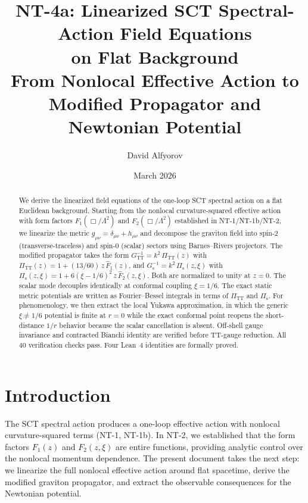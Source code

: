 \documentclass[11pt,a4paper]{article}
\title{NT-4a: Linearized SCT Spectral-Action Field Equations\\
on Flat Background\\[6pt]
\large From Nonlocal Effective Action to Modified Propagator
and Newtonian Potential}
\author{David Alfyorov}
\date{March 2026}
\theoremstyle{plain}
\theoremstyle{definition}
\begin{document}
\maketitle


\begin{center}
\end{center}

\begin{abstract}
We derive the linearized field equations of the one-loop SCT spectral
action on a flat Euclidean background. Starting from the nonlocal
curvature-squared effective action with form factors $F_1(\Box/\Lambda^2)$
and $F_2(\Box/\Lambda^2)$ established in NT-1/NT-1b/NT-2, we linearize
the metric $g_{\mu\nu} = \delta_{\mu\nu} + h_{\mu\nu}$ and decompose
the graviton field into spin-2 (transverse-traceless) and spin-0 (scalar)
sectors using Barnes--Rivers projectors. The modified propagator takes the
form $G^{-1}_{\mathrm{TT}} = k^2\, \Pi_{\mathrm{TT}}(z)$ with
$\Pi_{\mathrm{TT}}(z) = 1 + (13/60)\,z\,\hat{F}_1(z)$, and
$G^{-1}_{\mathrm{s}} = k^2\, \Pi_{\mathrm{s}}(z,\xi)$ with
$\Pi_{\mathrm{s}}(z,\xi) = 1 + 6(\xi-1/6)^2\,z\,\hat{F}_2(z,\xi)$.
Both are normalized to unity at $z = 0$. The scalar mode decouples
identically at conformal coupling $\xi = 1/6$. The exact static metric
potentials are written as Fourier--Bessel integrals in terms of
$\Pi_{\mathrm{TT}}$ and $\Pi_{\mathrm{s}}$. For phenomenology, we then
extract the local Yukawa approximation, in which the generic
$\xi \neq 1/6$ potential is finite at $r = 0$ while the exact conformal
point reopens the short-distance $1/r$ behavior because the scalar
cancellation is absent. Off-shell gauge invariance and contracted Bianchi
identity are verified before TT-gauge reduction. All 40 verification checks
pass. Four Lean~4 identities are formally proved.
\end{abstract}

\tableofcontents
\newpage

\section{Introduction}\label{sec:intro}

The SCT spectral action produces a one-loop effective action with
nonlocal curvature-squared terms (NT-1, NT-1b). In NT-2, we established
that the form factors $F_1(z)$ and $F_2(z,\xi)$ are entire functions,
providing analytic control over the nonlocal momentum dependence. The
present document takes the
next step: we linearize the full nonlocal effective action around flat
spacetime, derive the modified graviton propagator, and extract the
observable consequences for the Newtonian potential.
\end{document}

